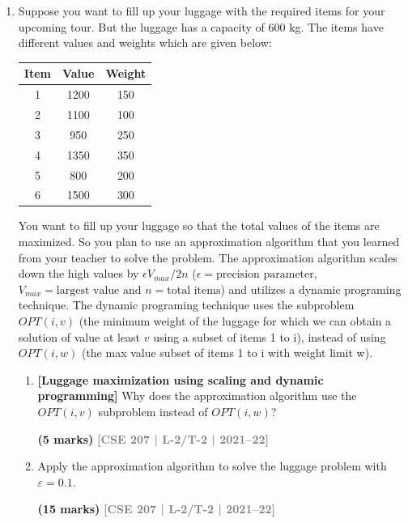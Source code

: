 \documentclass[12pt,a3paper]{article}
\newcommand{\yr}[1]{\hfill\textcolor{gray}{\small\textbf{[#1]}}}
\newcommand{\mk}[1]{\textcolor{orange!70!black}{\small\textbf{(#1 marks)}}}
\begin{document}
\begin{enumerate}
\item Suppose you want to fill up your luggage with the required items for your upcoming 
tour. But the luggage has a capacity of 600 kg. The items have different values and 
weights which are given below:

\begin{center}
\begin{tabular}{|c|c|c|}
\hline
\textbf{Item} & \textbf{Value} & \textbf{Weight} \\ \hline
1    & 1200  & 150    \\ \hline
2    & 1100  & 100    \\ \hline
3    & 950   & 250    \\ \hline
4    & 1350  & 350    \\ \hline
5    & 800   & 200    \\ \hline
6    & 1500  & 300    \\ \hline
\end{tabular}
\end{center}

You want to fill up your luggage so that the total values of the items are maximized. 
So you plan to use an approximation algorithm that you learned from your teacher to 
solve the problem. The approximation algorithm scales down the high values by 
$\epsilon V_{max}/2n$ ($\epsilon = \text{precision parameter}$, $V_{max} = \text{largest value and } n = \text{total items}$) and 
utilizes a dynamic programing technique. The dynamic programing technique uses 
the subproblem $OPT(i,v)$ (the minimum weight of the luggage for which we can 
obtain a solution of value at least $v$ using a subset of items 1 to i), instead of using 
$OPT(i, w)$ (the max value subset of items 1 to i with weight limit w).
\begin{enumerate}

\item \textbf{[Luggage maximization using scaling and dynamic programming]} Why does the approximation algorithm use the $OPT(i, v)$ subproblem instead of $OPT(i, w)$?
 
\mk{5} \yr{CSE 207 | L-2/T-2 | 2021--22}

\item Apply the approximation algorithm to solve the luggage problem with $\varepsilon = 0.1$.
 
\mk{15} \yr{CSE 207 | L-2/T-2 | 2021--22}


\end{enumerate}
\end{enumerate}
\end{document}
